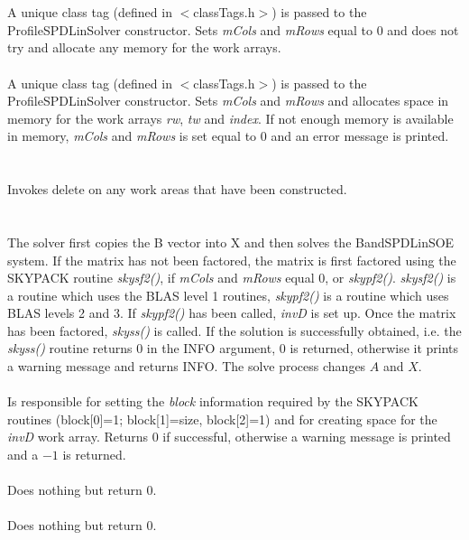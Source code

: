   \\
  \\
A unique class tag (defined in $<$classTags.h$>$) is passed to the
ProfileSPDLinSolver constructor. Sets {\em mCols} and {\em mRows}
equal to $0$ and does not try and allocate any memory for the work arrays.\\

  \\
A unique class tag (defined in $<$classTags.h$>$) is passed to the
ProfileSPDLinSolver constructor. Sets {\em mCols} and {\em mRows} and
allocates space in memory for the work arrays {\em rw}, {\em tw} and
{\em index}. If not enough memory is available in memory, {\em mCols}
and {\em mRows} is set equal to $0$ and an error message is printed. \\

 \\
\\ 
Invokes delete on any work areas that have been constructed. \\

  \\
 \\
The solver first copies the B vector into X and then solves the
BandSPDLinSOE system. If the matrix has not been factored, the matrix
is first factored using the SKYPACK routine {\em skysf2()}, if {\em
mCols} and {\em mRows} equal $0$, or {\em skypf2()}. {\em skysf2()} is
a routine which uses the BLAS level 1 routines, {\em skypf2()} is a
routine which uses BLAS levels 2 and 3. If {\em skypf2()}
has been called, {\em invD} is set up. Once the matrix has been
factored, {\em skyss()} is called. If the solution is successfully
obtained, i.e. the {\em skyss()} routine returns $0$ in the INFO
argument, $0$ is returned, otherwise it prints a warning message and
returns INFO. The solve process changes $A$ and $X$. \\   

 \\
Is responsible for setting the {\em block} information required by the
SKYPACK routines (block[0]=1; block[1]=size, block[2]=1) and for
creating space for the {\em invD} work array. Returns $0$ if
successful, otherwise a warning message is printed and a $-1$ is
returned. \\

 \\ 
Does nothing but return $0$. \\

 \\ 
Does nothing but return $0$. \\







